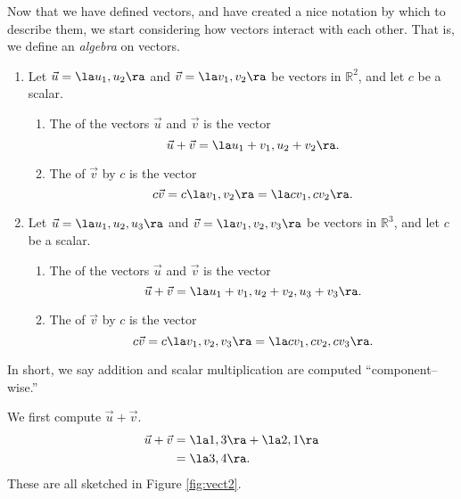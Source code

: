 \pagebreak

Now that we have defined vectors, and have created a nice notation by which to describe them, we start considering how vectors interact with each other. That is, we define an \textit{algebra} on vectors. 

{\begin{enumerate}
	\item Let $\vec u = \la u_1,u_2\ra$ and $\vec v = \la v_1,v_2\ra$ be vectors in $\mathbb{R}^2$, and let $c$ be a scalar. 
				\begin{enumerate}
					\item The  of the vectors $\vec u$ and $\vec v$ is the vector
					\[
					\vec u+\vec v = \la u_1+v_1, u_2+v_2\ra.
					\]
					\item	The  of $\vec v$ by $c$ is the vector 
					\[
					c\vec v = c\la v_1,v_2\ra = \la cv_1,cv_2\ra.
					\]
				\end{enumerate}
	\item Let $\vec u = \la u_1,u_2,u_3\ra$ and $\vec v = \la v_1,v_2,v_3\ra$ be vectors in $\mathbb{R}^3$, and let $c$ be a scalar. 
				\begin{enumerate}
					\item The  of the vectors $\vec u$ and $\vec v$ is the vector
					\[
					\vec u+\vec v = \la u_1+v_1, u_2+v_2, u_3+v_3\ra.
					\]
					\item	The  of $\vec v$ by $c$ is the vector 
	\[
			c\vec v = c\la v_1,v_2,v_3\ra = \la cv_1,cv_2,cv_3\ra.
	\]
				\end{enumerate}
\end{enumerate}
}

In short, we say addition and scalar multiplication are computed ``component--wise.''\\


	{We first compute $\vec u +\vec v$. 
	\begin{align*}
	\vec u+\vec v &= \la 1,3\ra + \la 2,1\ra\\
								&= \la 3,4\ra.
	\end{align*}
	These are all sketched in Figure \ref{fig:vect2}.
}\\
	
